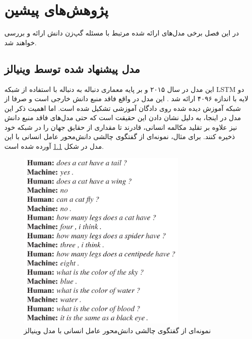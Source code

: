 \chapter{پژوهش‌های پیشین}\label{chap2}
\minitoc

در این فصل برخی مدل‌های ارائه شده مرتبط با مسئله گپ‌زن دانش  ارائه و بررسی خواهند شد. 

\section{مدل پیشنهاد شده توسط وینیالز}

این مدل در سال ۲۰۱۵ و بر پایه معماری دنباله به دنباله با استفاده از شبکه LSTM 
دو لایه با اندازه 
۴۰۹۶
ارائه شد
\cite{A_Neural_Conversational_Model}.
این مدل در واقع فاقد منبع دانش خارجی است و صرفا از شبکه آموزش دیده شده روی دادگان آموزشی تشکیل شده است. اما اهمیت ذکر این مدل در اینجا، به دلیل نشان دادن این حقیقت است که حتی مدل‌های فاقد منبع دانش نیز  علاوه بر تقلید 
 مکالمه انسانی، قادرند تا مقداری از حقایق جهان را در شبکه خود ذخیره کنند.
 برای مثال،‌ نمونه‌ای از گفتگوی چالشی دانش‌محور عامل انسانی با این مدل در شکل
 \ref{fig:chap2:Vinyals1}
 آورده شده است.

\begin{figure}[h]
	\centering
	\includegraphics[width=0.75\textwidth]{images/chap2/Vinyals1.png}
	\caption{
		نمونه‌‌ای از گفتگوی چالشی دانش‌محور عامل انسانی با مدل وینیالز
		\cite{A_Neural_Conversational_Model} 
	}
	\label{fig:chap2:Vinyals1}
\end{figure}

